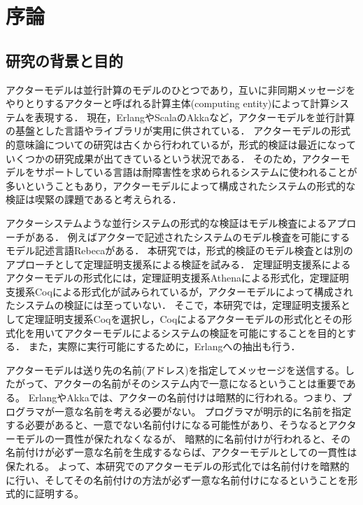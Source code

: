 \chapter{序論}
\label{chapter:intro}

\section{研究の背景と目的}
アクターモデル\cite{Agha:1986aa}は並行計算のモデルのひとつであり，互いに非同期メッセージをやりとりするアクターと呼ばれる計算主体(computing entity)によって計算システムを表現する．
現在，Erlang\cite{Erlang}やScala\cite{Scala}のAkka\cite{Akka}など，アクターモデルを並行計算の基盤とした言語やライブラリが実用に供されている．
アクターモデルの形式的意味論についての研究は古くから行われているが，形式的検証は最近になっていくつかの研究成果が出てきているという状況である．
そのため，アクターモデルをサポートしている言語は耐障害性を求められるシステムに使われることが多いということもあり，アクターモデルによって構成されたシステムの形式的な検証は喫緊の課題であると考えられる．

アクターシステムような並行システムの形式的な検証はモデル検査によるアプローチがある．
例えばアクターで記述されたシステムのモデル検査を可能にするモデル記述言語Rebeca\cite{Sirjani:2011aa}がある．
本研究では，形式的検証のモデル検査とは別のアプローチとして定理証明支援系による検証を試みる．
定理証明支援系によるアクターモデルの形式化には，定理証明支援系Athenaによる形式化\cite{Musser:2013aa}，定理証明支援系Coqによる形式化\cite{Garnock-Jones:2014aa}が試みられているが，アクターモデルによって構成されたシステムの検証には至っていない．
そこで，本研究では，定理証明支援系として定理証明支援系Coqを選択し，Coqによるアクターモデルの形式化とその形式化を用いてアクターモデルによるシステムの検証を可能にすることを目的とする．
また，実際に実行可能にするために，Erlangへの抽出も行う．

アクターモデルは送り先の名前(アドレス)を指定してメッセージを送信する。したがって、アクターの名前がそのシステム内で一意になるということは重要である。
ErlangやAkkaでは、アクターの名前付けは暗黙的に行われる。つまり、プログラマが一意な名前を考える必要がない。
プログラマが明示的に名前を指定する必要があると、一意でない名前付けになる可能性があり、そうなるとアクターモデルの一貫性が保たれなくなるが、
暗黙的に名前付けが行われると、その名前付けが必ず一意な名前を生成するならば、アクターモデルとしての一貫性は保たれる。
よって、本研究でのアクターモデルの形式化では名前付けを暗黙的に行い、そしてその名前付けの方法が必ず一意な名前付けになるということを形式的に証明する。

